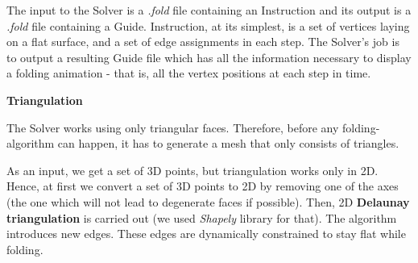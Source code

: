 The input to the Solver is a \textit{.fold} file containing an Instruction and its output is a \textit{.fold} file containing a Guide. 
Instruction, at its simplest, is a set of vertices laying on a flat surface, and a set of edge assignments in each step.
The Solver's job is to output a resulting Guide file which has all the information necessary to display
a folding animation - that is, all the vertex positions at each step in time.

\smallskip
\textbf{Triangulation}
\smallskip

The Solver works using only triangular faces.
Therefore, before any folding-algorithm can happen, it has to generate a mesh that only consists of triangles.
\begin{figure}[H]
    \centering
    \qquad
\end{figure}

As an input, we get a set of 3D points, but triangulation works only in 2D.
Hence, at first we convert a set of 3D points to 2D by removing one of the axes (the one which will not lead to degenerate faces if possible).
Then, 2D \textbf{Delaunay triangulation} is carried out (we used \textit{Shapely} library for that).
The algorithm introduces new edges. These edges are dynamically constrained to stay flat while folding.

